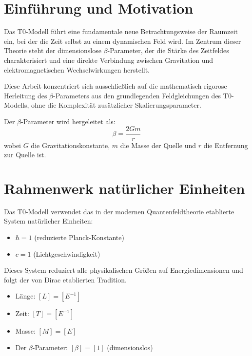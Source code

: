 \section{Einführung und Motivation}
	\label{sec:introduction}
	
	Das T0-Modell führt eine fundamentale neue Betrachtungsweise der Raumzeit ein, bei der die Zeit selbst zu einem dynamischen Feld wird. Im Zentrum dieser Theorie steht der dimensionslose $\beta$-Parameter, der die Stärke des Zeitfeldes charakterisiert und eine direkte Verbindung zwischen Gravitation und elektromagnetischen Wechselwirkungen herstellt.
	
	Diese Arbeit konzentriert sich ausschließlich auf die mathematisch rigorose Herleitung des $\beta$-Parameters aus den grundlegenden Feldgleichungen des T0-Modells, ohne die Komplexität zusätzlicher Skalierungsparameter.
	
	\begin{tcolorbox}[colback=blue!5!white,colframe=blue!75!black,title=Zentrales Ergebnis]
		Der $\beta$-Parameter wird hergeleitet als:
		\begin{equation}
			\boxed{\beta = \frac{2Gm}{r}}
		\end{equation}
		wobei $G$ die Gravitationskonstante, $m$ die Masse der Quelle und $r$ die Entfernung zur Quelle ist.
	\end{tcolorbox}
	
	\section{Rahmenwerk natürlicher Einheiten}
	\label{sec:natural_units}
	
	Das T0-Modell verwendet das in der modernen Quantenfeldtheorie \citep{peskin1995,weinberg1995} etablierte System natürlicher Einheiten:
	
	\begin{itemize}
		\item $\hbar = 1$ (reduzierte Planck-Konstante)
		\item $c = 1$ (Lichtgeschwindigkeit)
	\end{itemize}
	
	Dieses System reduziert alle physikalischen Größen auf Energiedimensionen und folgt der von Dirac \citep{dirac1958} etablierten Tradition.
	
	\begin{tcolorbox}[colback=blue!5!white,colframe=blue!75!black,title=Dimensionen in natürlichen Einheiten]
		\begin{itemize}
			\item Länge: $[L] = [E^{-1}]$
			\item Zeit: $[T] = [E^{-1}]$ 
			\item Masse: $[M] = [E]$
			\item Der $\beta$-Parameter: $[\beta] = [1]$ (dimensionslos)
		\end{itemize}
	\end{tcolorbox}
	
